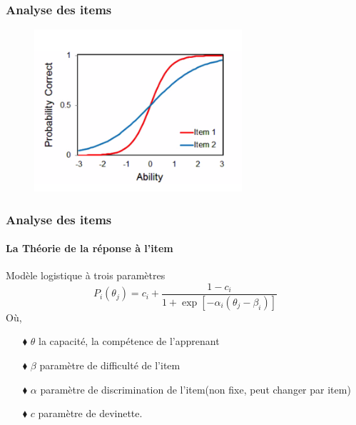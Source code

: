 \documentclass[aspectratio=169,professionalfonts, 12pt]{beamer}
\begin{document}
\begin{frame}
  \frametitle{Analyse des items}
  \justifying 
  \begin{minipage}{\textwidth}
  \begin{figure}[H]
      \includegraphics[height=6cm]{images/etat_art/2pl.png}
  \end{figure}
  \end{minipage}
\end{frame}

\begin{frame}
  \frametitle{Analyse des items}
  \framesubtitle{La Théorie de la réponse à l'item}
  \justifying
  \begin{minipage}{\textwidth}
  \begin{block}{Modèle logistique à trois paramètres}
    \begin{equation}
      P_{i}(\theta_{j}) = c_{i} +  \frac{1 - c_{i}}{1+ \exp \left[ -\alpha_{i}(\theta_{j}-\beta_{i}) \right]  } 
    \end{equation}
    Où, \\
    \begin{itemize}
      \item[$\blacklozenge$] \(\displaystyle \theta \) la capacité, la compétence de l'apprenant 
      \item[$\blacklozenge$] \(\displaystyle \beta \) paramètre de difficulté de l'item
      \item[$\blacklozenge$] \(\displaystyle \alpha \) paramètre de discrimination de l'item(non fixe, peut changer par item)
      \item[$\blacklozenge$] \(\displaystyle c \) paramètre de devinette.
    \end{itemize}
  \end{block}  
  \end{minipage} 
\end{frame}
\end{document}
